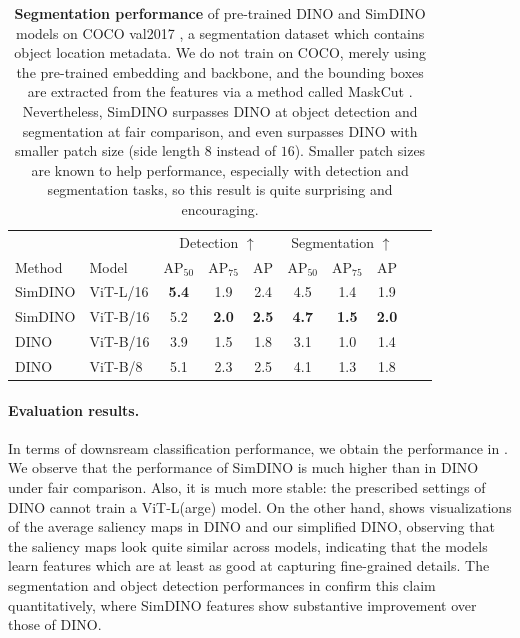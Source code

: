 \documentclass[../../book-main.tex]{subfiles}
\begin{document}
\begin{table}
    \centering 
    \begin{tabular}{@{}llcccccccc@{}}
        \toprule
         &  & \multicolumn{3}{c}{Detection $\uparrow$} &  \multicolumn{3}{c}{Segmentation $\uparrow$} \\ 
        Method & Model & AP$_{50}$  & AP$_{75}$ & AP & AP$_{50}$ & AP$_{75}$ & AP  \\ 
        \midrule
        SimDINO &ViT-L/16 &\bf 5.4 &1.9 &2.4 &4.5 &1.4 &1.9 \\
        SimDINO &ViT-B/16 &5.2 & \bf 2.0 & \bf 2.5 & \bf4.7 & \bf 1.5 & \bf 2.0 \\
        DINO &ViT-B/16 &3.9 &1.5 &1.8 &3.1 &1.0 &1.4 \\
        \midrule
        \color{gray} DINO & \color{gray} ViT-B/8 & \color{gray}5.1 & \color{gray}2.3 & \color{gray}2.5 & \color{gray}4.1 & \color{gray}1.3 & \color{gray}1.8 \\
        \bottomrule
    \end{tabular}
    \caption{\small\textbf{Segmentation performance} of pre-trained DINO and SimDINO models on COCO val2017 \citep{lin2014microsoft}, a segmentation dataset which contains object location metadata. We do not train on COCO, merely using the pre-trained embedding and backbone, and the bounding boxes are extracted from the features via a method called MaskCut \citep{wang2023cut}. Nevertheless, SimDINO surpasses DINO at object detection and segmentation at fair comparison, and even surpasses DINO with smaller patch size (side length \(8\) instead of \(16\)). Smaller patch sizes are known to help performance, especially with detection and segmentation tasks, so this result is quite surprising and encouraging.}
    \label{tab:dino_segmentation}
\end{table}

\paragraph{Evaluation results.} In terms of downsream classification performance, we obtain the performance in . We observe that the performance of SimDINO is much higher than in DINO under fair comparison. Also, it is much more stable: the prescribed settings of DINO cannot train a ViT-L(arge) model. On the other hand,  shows visualizations of the average saliency maps in DINO and our simplified DINO, observing that the saliency maps look quite similar across models, indicating that the models learn features which are at least as good at capturing fine-grained details. The segmentation and object detection performances in  confirm this claim quantitatively, where SimDINO features show substantive improvement over those of DINO.
\end{document}
